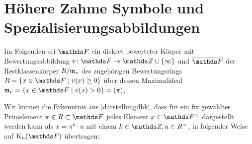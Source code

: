 \documentclass[ngerman,fontsize=11pt, paper=a4, parskip=half, titlepage=true, toc=bib]{scrartcl}
\begin{document}

\section{Höhere Zahme Symbole und Spezialisierungsabbildungen}
Im Folgenden sei $\F$ ein diskret bewerteter Körper mit
Bewertungsabbildung $v\colon \F\to\Z\cup\{\infty\}$ und
$\overline{\F}$ der Restklassenkörper $R/\mathfrak{m}_v$ 
des zugehörigen Bewertungsrings $R=\left\{x\in\F\mid v(x)\geq0\right\}$
über dessen Maximalideal $\frakm_v=\left\{x\in\F\mid v(x)>0\right\}=(\pi)$.

Wir können die Erkenntnis aus \ref{darstellungdbk},
dass für ein fix gewähltes Primelement $\pi\in R\subset \F$
jedes Element $x\in\Fx$ dargestellt werden kann als 
$x=\pi^k\cdot u$ mit einem $k\in\Z, u\in \Rx$,
in folgender Weise auf $\KnF$ übertragen:
\end{document}
